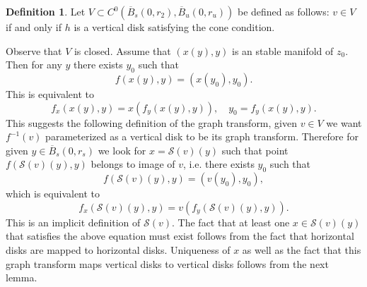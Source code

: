 \documentclass[11pt, leqno]{amsart}
\theoremstyle{definition}
\newtheorem{df}[thm]{Definition}
\begin{document}
\begin{df}
Let $V \subset C^{0}(\overline{B}_s(0,r_2),\overline{B}_u(0,r_u))$ be defined as follows: $v \in V$ if and only if $h$ is a vertical disk satisfying the cone condition.
\end{df}
Observe that $V$ is closed. Assume that $(x(y),y)$ is an stable manifold of $z_0$. Then for any $y$ there exists $y_0$ such that
\begin{equation}
  f(x(y),y)=(x(y_0),y_0).
\end{equation}
This is equivalent to
\begin{equation}
  f_x(x(y),y)=x(f_y(x(y),y)), \quad y_0=f_y(x(y),y).
\end{equation}
This suggests the following definition of the graph transform, given $v \in V$ we want $f^{-1}(v)$ parameterized as a vertical disk to be its graph transform. Therefore for given $y \in \overline{B}_s(0,r_s)$ we look for $x=\mathcal{S}(v)(y)$ such that point $f(\mathcal{S}(v)(y),y)$ belongs to image of  $v$, i.e. there exists $y_0$ such that
\begin{equation}
  f(\mathcal{S}(v)(y),y)=(v(y_0),y_0),
\end{equation}
which is equivalent to
\begin{equation}
  f_x(\mathcal{S}(v)(y),y)=v( f_y(\mathcal{S}(v)(y),y)).  \label{eq:def-S}
\end{equation}
This is an implicit definition of $\mathcal{S}(v)$. The fact that at least one $x\in \mathcal{S}(v)(y)$ that satisfies the above equation must exist follows from the fact that horizontal disks are mapped to horizontal disks. Uniqueness of $x$ as well as the fact that this graph transform maps vertical disks to vertical disks follows from the next lemma.
\end{document}
